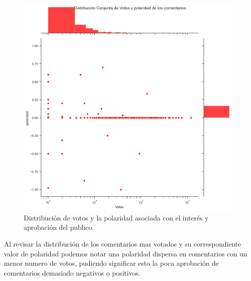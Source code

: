 \begin{figure}[!h]
	\centering
	\includegraphics[width=16cm]{../Datos/DisVotosPolaridad}
	\caption[Distribución de frecuencia de voto y su polaridad]{Distribución de votos y la polaridad asociada con el interés y aprobación del publico.}
	\label{fig:dvp}
\end{figure}

Al revisar la distribución de los comentarios mas votados y su correspondiente valor de polaridad podemos notar una polaridad dispersa en comentarios con un menor numero de votos, pudiendo significar esto la poca aprobación de comentarios demasiado negativos o positivos.\\


